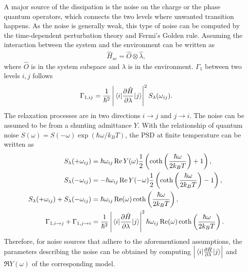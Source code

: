 \documentclass[a4paper,onecolumn,11pt,unpublished]{quantumarticle}
\newcommand{\melabs}[3]{\left|\mel{#1}{#2}{#3}\right|}
\begin{document}
A major source of the dissipation is the noise on the charge or the phase quantum operators, which connects the two levels where unwanted transition happens. As the noise is generally weak, this type of noise can be computed by the time-dependent perturbation theory and Fermi's Golden rule. Assuming the interaction between the system and the environment can be written as
\begin{align}
  \hat{H}_{se} = \hat{O} \otimes \hat{\lambda}, \label{eq:ham_system_env}
\end{align}
where $\hat{O}$ is in the system subspace and $\lambda$ is in the environment.
$\Gamma_1$ between two levels $i,j$ follows
\begin{align}
  \Gamma_{1,ij} & = \frac{1}{\hbar^2}\left|\mel{i}{\frac{\partial \hat{H}}{\partial \lambda}}{j}\right|^2S_{\lambda}(\omega_{ij}). \label{eq:t1_fermi_golden_rule_1} \\
\end{align}
The relaxation processes are in two directions $i\rightarrow j$ and $j\rightarrow i$. The noise can be assumed to be from a shunting admittance $Y$. With the relationship of quantum noise $S(\omega)=S(-\omega)\exp(\hbar\omega/k_B T)$, the PSD at finite temperature can be written as~\cite{Nguyen2019HighCoherence,Pop2014Coherent}
\begin{align}
  S_{\lambda}(+\omega_{ij})                             & = \hbar\omega_{ij}\Re Y(\omega)\frac{1}{2}\left(\coth\left(\frac{\hbar\omega}{2k_BT}\right)+1\right), \label{eq:psd_plus_y}                                               \\
  S_{\lambda}(-\omega_{ij})                             & = -\hbar\omega_{ij}\Re Y(-\omega)\frac{1}{2}\left(\coth\left(\frac{\hbar\omega}{2k_BT}\right)-1\right), \label{eq:psd_minus_y}                                            \\
  S_{\lambda}(+\omega_{ij})+S_{\lambda}(-\omega_{ij})   & = \hbar\omega_{ij}\Re(\omega)\coth\left(\frac{\hbar\omega}{2k_BT}\right), \label{eq:psd_sum_sign}                                                                         \\
  \Gamma_{1,i\rightarrow j} + \Gamma_{1,j\rightarrow i} & = \frac{1}{\hbar^2}\melabs{i}{\frac{\partial \hat{H}}{\partial \lambda}}{j}^2 \hbar\omega_{ij}\Re(\omega)\coth\left(\frac{\hbar\omega}{2k_BT}\right). \label{eq:t1_y_sum}
\end{align}
Therefore, for noise sources that adhere to the aforementioned assumptions, the parameters describing the noise can be obtained by computing $\melabs{i}{\frac{\partial \hat{H}}{\partial \lambda}}{j}$ and $\Re Y(\omega)$ of the corresponding model.
\end{document}
